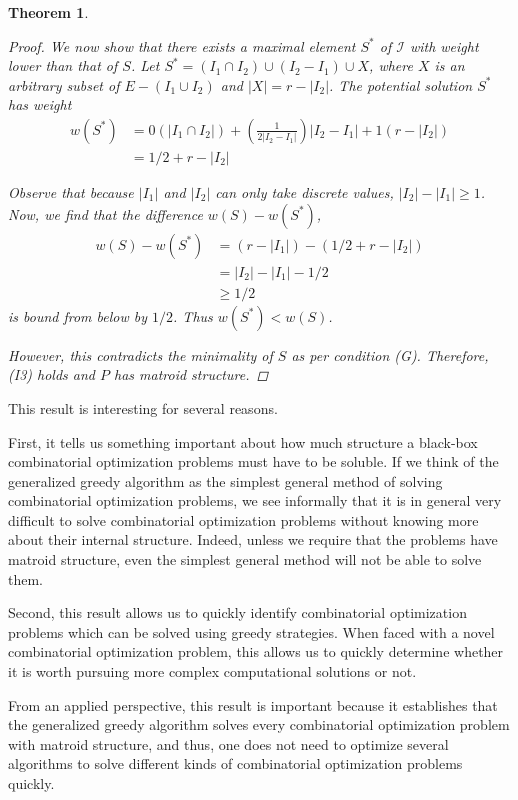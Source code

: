\documentclass[a4paper,11pt]{report}
\theoremstyle{plain}
\newtheorem{thm}{Theorem}[section]
\theoremstyle{definition}
\newcommand{\I}{\mathcal{I}}
\begin{document}
\begin{thm}
\begin{proof}
We now show that there exists a maximal element $S^*$ of $\I$ with weight lower
than that of $S$. Let $S^* = (I_1 \cap I_2) \cup (I_2 - I_1) \cup X$, where
$X$ is an arbitrary subset of $E - (I_1 \cup I_2)$ and $|X| = r - |I_2|$. The
potential solution $S^*$ has weight
\begin{align*}
    w(S^*) &= 0(|I_1 \cap I_2|) + \left(\frac{1}{2|I_2 - I_1|}\right)|I_2 - I_1| + 1(r - |I_2|)\\
    &= 1/2 + r - |I_2|
\end{align*}

Observe that because $|I_1|$ and $|I_2|$ can only take discrete values,
$|I_2| - |I_1| \geq 1$. Now, we find that the difference $w(S) - w(S^*)$,
\begin{align*}
    w(S) - w(S^*) &= (r - |I_1|) - (1/2 + r - |I_2|)\\
    &= |I_2| - |I_1| - 1/2\\
    &\geq 1/2
\end{align*}
is bound from below by $1/2$. Thus $w(S^*) < w(S)$.

However, this contradicts the minimality of $S$ as per condition (G).
Therefore, (I3) holds and $P$ has matroid structure.
\end{proof}
\end{thm}

This result is interesting for several reasons.

First, it tells us something important about how much structure a black-box
combinatorial optimization problems must have to be soluble. If we think of the
generalized greedy algorithm as the simplest general method of solving
combinatorial optimization problems, we see informally that it is in general
very difficult to solve combinatorial optimization problems without knowing
more about their internal structure. Indeed, unless we require that the
problems have matroid structure, even the simplest general method will not be
able to solve them.

Second, this result allows us to quickly identify combinatorial optimization
problems which can be solved using greedy strategies. When faced with a novel
combinatorial optimization problem, this allows us to quickly determine
whether it is worth pursuing more complex computational solutions or not.

From an applied perspective, this result is important because it establishes
that the generalized greedy algorithm solves every combinatorial optimization
problem with matroid structure, and thus, one does not need to optimize several
algorithms to solve different kinds of combinatorial optimization problems
quickly.
\end{document}
